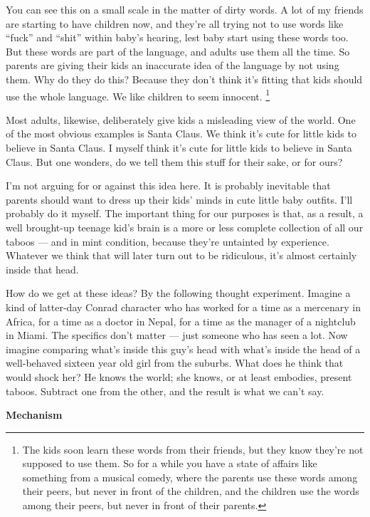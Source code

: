 \documentclass[12pt]{book}
\begin{document}
You can see this on a small scale in the matter of dirty words. A lot of
my friends are starting to have children now, and they're all trying not
to use words like ``fuck'' and ``shit'' within baby's hearing, lest baby
start using these words too. But these words are part of the language,
and adults use them all the time. So parents are giving their kids an
inaccurate idea of the language by not using them. Why do they do this?
Because they don't think it's fitting that kids should use the whole
language. We like children to seem innocent. \footnote{The kids soon learn these words from their friends, but they
know they're not supposed to use them. So for a while you have a state
of affairs like something from a musical comedy, where the parents use
these words among their peers, but never in front of the children, and
the children use the words among their peers, but never in front of
their parents.}

Most adults, likewise, deliberately give kids a misleading view of the
world. One of the most obvious examples is Santa Claus. We think it's
cute for little kids to believe in Santa Claus. I myself think it's cute
for little kids to believe in Santa Claus. But one wonders, do we tell
them this stuff for their sake, or for ours?

I'm not arguing for or against this idea here. It is probably inevitable
that parents should want to dress up their kids' minds in cute little
baby outfits. I'll probably do it myself. The important thing for our
purposes is that, as a result, a well brought-up teenage kid's brain is
a more or less complete collection of all our taboos --- and in mint
condition, because they're untainted by experience. Whatever we think
that will later turn out to be ridiculous, it's almost certainly inside
that head.

How do we get at these ideas? By the following thought experiment.
Imagine a kind of latter-day Conrad character who has worked for a time
as a mercenary in Africa, for a time as a doctor in Nepal, for a time as
the manager of a nightclub in Miami. The specifics don't matter --- just
someone who has seen a lot. Now imagine comparing what's inside this
guy's head with what's inside the head of a well-behaved sixteen year
old girl from the suburbs. What does he think that would shock her? He
knows the world; she knows, or at least embodies, present taboos.
Subtract one from the other, and the result is what we can't say.

\textbf{Mechanism}
\end{document}
